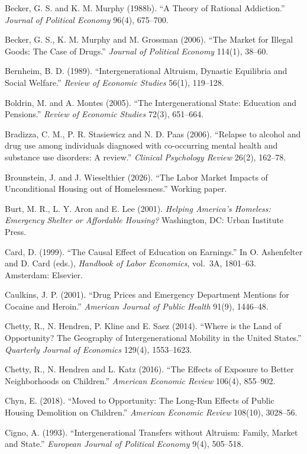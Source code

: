 \documentclass[10pt]{article}
\begin{document}
{\begin{list}{}{\setlength{\leftmargin}{1.5em}\setlength{\itemindent}{-1.5em}\setlength{\itemsep}{0.35em}\setlength{\parsep}{0em}}
\item Becker, G. S. and K. M. Murphy (1988b). ``A Theory of Rational Addiction.'' \emph{Journal of Political Economy} 96(4), 675--700.
\item Becker, G. S., K. M. Murphy and M. Grossman (2006). ``The Market for Illegal Goods: The Case of Drugs.'' \emph{Journal of Political Economy} 114(1), 38--60.
\item Bernheim, B. D. (1989). ``Intergenerational Altruism, Dynastic Equilibria and Social Welfare.'' \emph{Review of Economic Studies} 56(1), 119--128.
\item Boldrin, M. and A. Montes (2005). ``The Intergenerational State: Education and Pensions.'' \emph{Review of Economic Studies} 72(3), 651--664.
\item Bradizza, C. M., P. R. Stasiewicz and N. D. Paas (2006). ``Relapse to alcohol and drug use among individuals diagnosed with co-occurring mental health and substance use disorders: A review.'' \emph{Clinical Psychology Review} 26(2), 162--78.
\item Brounstein, J. and J. Wieselthier (2026). ``The Labor Market Impacts of Unconditional Housing out of Homelessness.'' Working paper.
\item Burt, M. R., L. Y. Aron and E. Lee (2001). \emph{Helping America's Homeless: Emergency Shelter or Affordable Housing?} Washington, DC: Urban Institute Press.
\item Card, D. (1999). ``The Causal Effect of Education on Earnings.'' In O. Ashenfelter and D. Card (eds.), \emph{Handbook of Labor Economics}, vol.\ 3A, 1801--63. Amsterdam: Elsevier.
\item Caulkins, J. P. (2001). ``Drug Prices and Emergency Department Mentions for Cocaine and Heroin.'' \emph{American Journal of Public Health} 91(9), 1446--48.
\item Chetty, R., N. Hendren, P. Kline and E. Saez (2014). ``Where is the Land of Opportunity? The Geography of Intergenerational Mobility in the United States.'' \emph{Quarterly Journal of Economics} 129(4), 1553--1623.
\item Chetty, R., N. Hendren and L. Katz (2016). ``The Effects of Exposure to Better Neighborhoods on Children.'' \emph{American Economic Review} 106(4), 855--902.
\item Chyn, E. (2018). ``Moved to Opportunity: The Long-Run Effects of Public Housing Demolition on Children.'' \emph{American Economic Review} 108(10), 3028--56.
\item Cigno, A. (1993). ``Intergenerational Transfers without Altruism: Family, Market and State.'' \emph{European Journal of Political Economy} 9(4), 505--518.

\end{list}}
\end{document}
